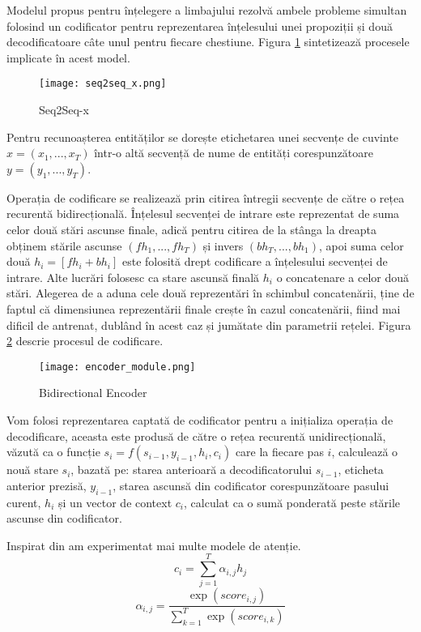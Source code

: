 Modelul propus pentru înțelegere a limbajului rezolvă ambele probleme simultan folosind un codificator pentru reprezentarea înțelesului unei propoziții și două decodificatoare câte unul pentru fiecare chestiune. Figura \ref{fig:seq2seq_x} sintetizează procesele implicate în acest model.

\begin{figure}[htbp]
	\centering
	\texttt{[image: seq2seq\_x.png]}
	\caption{Seq2Seq-x}
	\label{fig:seq2seq_x}
\end{figure}

Pentru recunoașterea entităților se dorește etichetarea unei secvențe de cuvinte $ x= (x_1, ..., x_T)$ într-o altă secvență de nume de entități corespunzătoare $ y=(y_1, ..., y_T) $.

Operația de codificare se realizează prin citirea întregii secvențe de către o rețea recurentă bidirecțională. Înțelesul secvenței de intrare este reprezentat de suma celor două stări ascunse finale, adică pentru citirea de la stânga la dreapta obținem stările ascunse $(fh_1, ..., fh_T)$ și invers $(bh_T, ..., bh_1)$, apoi suma celor două $h_i = [fh_i + bh_i]$ este folosită drept codificare a înțelesului secvenței de intrare. Alte lucrări \cite{joint_online_bing} folosesc ca stare ascunsă finală $h_i$ o concatenare a celor două stări. Alegerea de a aduna cele două reprezentări în schimbul concatenării, ține de faptul că dimensiunea reprezentării finale crește în cazul concatenării, fiind mai dificil de antrenat, dublând în acest caz și jumătate din parametrii rețelei. Figura \ref{fig:enc_module} descrie procesul de codificare.

\begin{figure}[h]
	\centering
	\texttt{[image: encoder\_module.png]}
	\caption{Bidirectional Encoder}
	\label{fig:enc_module}
\end{figure}

Vom folosi reprezentarea captată de codificator pentru a inițializa operația de decodificare, aceasta este produsă de către o rețea recurentă unidirecțională, văzută ca o funcție $s_i=f(s_{i-1}, y_{i-1}, h_i, c_i)$ care la fiecare pas $i$, calculează o nouă stare $s_i$, bazată pe: starea anterioară a decodificatorului $s_{i-1}$, eticheta anterior prezisă, $y_{i-1}$, starea ascunsă din codificator corespunzătoare pasului curent, $h_i$ și un vector de context $c_i$, calculat ca o sumă ponderată peste stările ascunse din codificator.

Inspirat din \cite{trans_luong_manning} am experimentat mai multe modele de atenție.
$$ c_i = \sum_{j=1}^{T} \alpha_{i,j} h_j$$
$$ \alpha_{i,j} = \frac{\exp(score_{i, j})}{\sum_{k=1}^{T} \exp(score_{i, k})}$$

